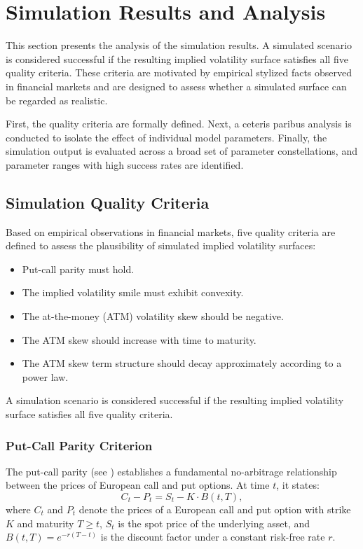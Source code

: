\section{Simulation Results and Analysis} \label{sec:SimulationResultsAnalysis}

This section presents the analysis of the simulation results. A simulated scenario is considered successful if the resulting implied volatility surface satisfies all five quality criteria. These criteria are motivated by empirical stylized facts observed in financial markets and are designed to assess whether a simulated surface can be regarded as realistic.

First, the quality criteria are formally defined. Next, a ceteris paribus analysis is conducted to isolate the effect of individual model parameters. Finally, the simulation output is evaluated across a broad set of parameter constellations, and parameter ranges with high success rates are identified.


\subsection{Simulation Quality Criteria} \label{subsec:SimulationQualityCriteria}

Based on empirical observations in financial markets, five quality criteria are defined to assess the plausibility of simulated implied volatility surfaces:
\begin{itemize}
    \item Put-call parity must hold.
    \item The implied volatility smile must exhibit convexity.
    \item The at-the-money (ATM) volatility skew should be negative.
    \item The ATM skew should increase with time to maturity.
    \item The ATM skew term structure should decay approximately according to a power law.
\end{itemize}
A simulation scenario is considered successful if the resulting implied volatility surface satisfies all five quality criteria.

\subsubsection*{Put-Call Parity Criterion}
The put-call parity (see \citealp{Björk2009}) establishes a fundamental no-arbitrage relationship between the prices of European call and put options. At time $t$, it states:
\begin{equation} \label{eq:PutCallParity}
    C_t - P_t = S_t - K \cdot B(t,T),
\end{equation}
where $C_t$ and $P_t$ denote the prices of a European call and put option with strike $K$ and maturity $T \geq t$, $S_t$ is the spot price of the underlying asset, and $B(t,T) = e^{-r(T - t)}$ is the discount factor under a constant risk-free rate $r$.

